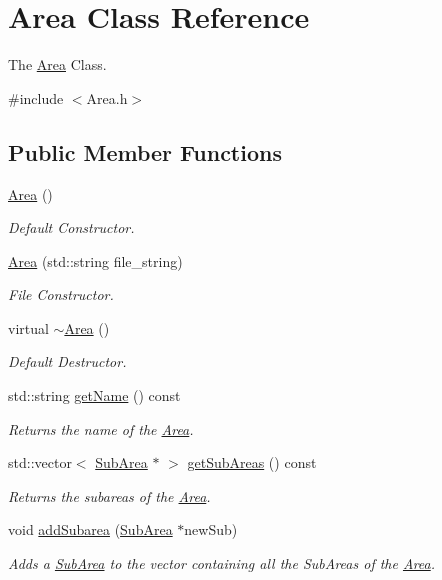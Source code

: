 \hypertarget{classArea}{}\section{Area Class Reference}
\label{classArea}


The \mbox{\hyperlink{classArea}{Area}} Class.  




{\ttfamily \#include $<$Area.\+h$>$}

\subsection*{Public Member Functions}
\begin{DoxyCompactItemize}
\item 
\mbox{\hyperlink{classArea_aa92851fcffb0a9f1c6c8c283204f7003}{Area}} ()
\begin{DoxyCompactList}\small\item\em Default Constructor. \end{DoxyCompactList}\item 
\mbox{\hyperlink{classArea_afd32499f2246ef8007fd135d7503da16}{Area}} (std\+::string file\+\_\+string)
\begin{DoxyCompactList}\small\item\em File Constructor. \end{DoxyCompactList}\item 
virtual \mbox{\hyperlink{classArea_ace0975982b61a16746c564a0d43a4cc8}{$\sim$\+Area}} ()
\begin{DoxyCompactList}\small\item\em Default Destructor. \end{DoxyCompactList}\item 
std\+::string \mbox{\hyperlink{classArea_acdbc3527be262d1ea1b9c961e823257f}{get\+Name}} () const
\begin{DoxyCompactList}\small\item\em Returns the name of the \mbox{\hyperlink{classArea}{Area}}. \end{DoxyCompactList}\item 
std\+::vector$<$ \mbox{\hyperlink{classSubArea}{Sub\+Area}} $\ast$ $>$ \mbox{\hyperlink{classArea_abf3bfb978d0a7d05fe2cbbad9ce7fef4}{get\+Sub\+Areas}} () const
\begin{DoxyCompactList}\small\item\em Returns the subareas of the \mbox{\hyperlink{classArea}{Area}}. \end{DoxyCompactList}\item 
void \mbox{\hyperlink{classArea_a137ad0664d3993ff994e2381804459e2}{add\+Subarea}} (\mbox{\hyperlink{classSubArea}{Sub\+Area}} $\ast$new\+Sub)
\begin{DoxyCompactList}\small\item\em Adds a \mbox{\hyperlink{classSubArea}{Sub\+Area}} to the vector containing all the Sub\+Areas of the \mbox{\hyperlink{classArea}{Area}}. \end{DoxyCompactList}\end{DoxyCompactItemize}
